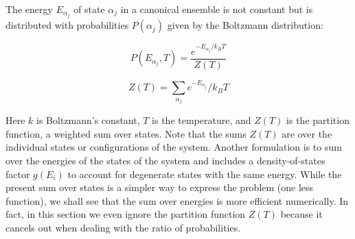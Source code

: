 \documentclass[12pt]{article}
\theoremstyle{plain}
\begin{document}
\par The energy $E_{\alpha_j}$ of state $\alpha_j$ in a canonical ensemble is not constant but is distributed with
probabilities $P(\alpha_j)$ given by the Boltzmann distribution:

\vspace{2mm}

\begin{equation*}
    P(E_{\alpha_j}, T) = \frac{e^{-E_{\alpha_j} / k_B T}}{Z(T)}
\end{equation*}

\vspace{2mm}

\begin{equation*}
    Z(T) = \sum_{\alpha_j} e^{-E_{\alpha_j}} / k_B T
\end{equation*}

\vspace{2mm}

\par Here $k$ is Boltzmann’s constant, $T$ is the temperature, and $Z(T)$ is the partition function,
a weighted sum over states. Note that the sums $Z(T)$ are over the individual states or
configurations of the system. Another formulation is to sum over the energies of the states of the system and includes a density-of-states
factor $g(E_i)$ to account for degenerate states with the same energy. While the present sum over
states is a simpler way to express the problem (one less function), we shall see that the sum
over energies is more efficient numerically. In fact, in this section we even ignore the partition
function $Z(T)$ because it cancels out when dealing with the ratio of probabilities.

\vspace{2mm}





\end{document}
